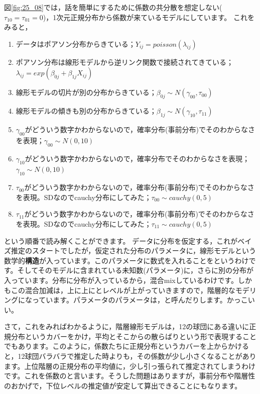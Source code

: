 \documentclass{ltjsbook}
\begin{document}
図\ref{fig:25_08}では，話を簡単にするために係数の共分散を想定しない($\tau_{10}=\tau_{01}=0$)，1次元正規分布から係数が来ているモデルにしています。
これをみると，
\begin{enumerate}
    \item データはポアソン分布からきている；$Y_{ij} = poisson(\lambda_{ij})$
    \item ポアソン分布は線形モデルから逆リンク関数で接続されてきている；$\lambda_{ij} = exp(\beta_{0j}+\beta_{1j}X_{ij})$
    \item 線形モデルの切片が別の分布からきている；$\beta_{0j}\sim N(\gamma_{00},\tau_{00})$
    \item 線形モデルの傾きも別の分布からきている；$\beta_{1j}\sim N(\gamma_{10},\tau_{11})$
    \item $\gamma_{00}$がどういう数字かわからないので，確率分布(事前分布)でそのわからなさを表現；$\gamma_{00} \sim N(0,10)$
    \item $\gamma_{10}$がどういう数字かわからないので，確率分布でそのわからなさを表現；$\gamma_{10} \sim N(0,10)$
    \item $\tau_{00}$がどういう数字かわからないので，確率分布(事前分布)でそのわからなさを表現。SDなのでcauchy分布にしてみた；$\tau_{00} \sim cauchy(0,5)$
    \item $\tau_{11}$がどういう数字かわからないので，確率分布(事前分布)でそのわからなさを表現。SDなのでcauchy分布にしてみた；$\tau_{11} \sim cauchy(0,5)$
\end{enumerate}
という順番で読み解くことができます。
データに分布を仮定する，これがベイズ推定のスタートでしたが，仮定された分布のパラメータに，線形モデルという数学的\textbf{構造}が入っています。このパラメータに数式を入れることをというわけです。そしてそのモデルに含まれている未知数(パラメータ)に，さらに別の分布が入っています。分布に分布が入っているから，混合mixしているわけです。しかもこの混合加減は，上に上にとレベルが上がっていきますので，階層的なモデリングになっています。パラメータのパラメータは，と呼んだりします。かっこいい。

さて，これをみればわかるように，階層線形モデルは，12の球団にある違いに正規分布というカバーをかけ，平均とそこからの散らばりという形で表現することでもあります。このように，係数たちに正規分布というカバーを上からかけると，12球団バラバラで推定した時よりも，その係数が少し小さくなることがあります。上位階層の正規分布の平均値に，少し引っ張られて推定されてしまうわけです。これを係数のと言います。そうした問題はありますが，事前分布や階層性のおかげで，下位レベルの推定値が安定して算出できることにもなります。
\end{document}
